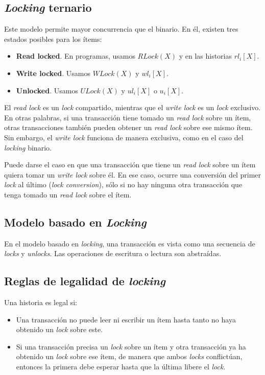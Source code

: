 \documentclass[english]{article}
\theoremstyle{definition}
\theoremstyle{definition}
\begin{document}
\subsection{\emph{Locking} ternario}

Este modelo permite mayor concurrencia que el binario. En él, existen tres
estados posibles para los ítems:

\begin{itemize}
    \item \textbf{Read locked}. En programas, usamos $RLock(X)$ y en las
        historias $rl_i[X]$.
    \item \textbf{Write locked}. Usamos $WLock(X)$ y $wl_i[X]$.
    \item \textbf{Unlocked}. Usamos $ULock(X)$ y $ul_i[X]$ o $u_i[X]$.
\end{itemize}

El \emph{read lock} es un \emph{lock} compartido, mientras que el
\emph{write lock} es un \emph{lock} exclusivo. En otras palabras, si una
transacción tiene tomado un \emph{read lock} sobre un ítem, otras
transacciones también pueden obtener un \emph{read lock} sobre ese mismo ítem.
Sin embargo, el \emph{write lock} funciona de manera exclusiva, como en el
caso del \emph{locking} binario.

Puede darse el caso en que una transacción que tiene un \emph{read lock} sobre
un ítem quiera tomar un \emph{write lock} sobre él. En ese caso, ocurre una
conversión del primer \emph{lock} al último (\emph{lock conversion}), sólo si
no hay ninguna otra transacción que tenga tomado un \emph{read lock} sobre el
ítem.

\subsection{Modelo basado en \emph{Locking}}

En el modelo basado en \emph{locking}, una transacción es vista como una
secuencia de \emph{locks} y \emph{unlocks}. Las operaciones de escritura o
lectura son abstraídas.

\subsection{Reglas de legalidad de \emph{locking}}

Una historia es legal si:

\begin{itemize}
    \item Una transacción no puede leer ni escribir un ítem hasta tanto no
        haya obtenido un \emph{lock} sobre este.
    \item Si una transacción precisa un \emph{lock} sobre un ítem y
        otra transacción ya ha obtenido un \emph{lock} sobre ese ítem, de
        manera que ambos \emph{locks} conflictúan, entonces la primera debe
        esperar hasta que la última libere el \emph{lock}.
\end{itemize}
        
\end{document}
